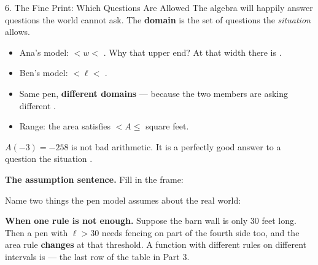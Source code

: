 \documentclass[10pt]{article}
\begin{document}
\vspace{0.1in}

\boxguard[20]
\begin{notesbox}{6. The Fine Print: Which Questions Are Allowed}
The algebra will happily answer questions the world cannot ask. The
\textbf{domain} is the set of questions the \textit{situation} allows.

\medskip
\begin{itemize}[itemsep=5pt]
  \item Ana's model:  $< w <$ . \quad Why that upper
        end? At that width there is .
  \item Ben's model:  $< \ell <$ .
  \item Same pen, \textbf{different domains} --- because the two members are
        asking different .
  \item Range: the area satisfies  $< A \le$ 
        square feet.
\end{itemize}

\smallskip
$A(-3) = -258$ is not bad arithmetic. It is a perfectly good answer to a
question the situation .

\medskip
\textbf{The assumption sentence.} Fill in the frame:

\smallskip
\begin{center}
\end{center}

\medskip
Name two things the pen model assumes about the real world:


\medskip
\textbf{When one rule is not enough.} Suppose the barn wall is only 30 feet
long. Then a pen with $\ell > 30$ needs fencing on part of the fourth side too,
and the area rule \textbf{changes} at that threshold. A function with different
rules on different intervals is  --- the last row of the table in
Part 3.
\end{notesbox}

\vspace{0.1in}
\end{document}
